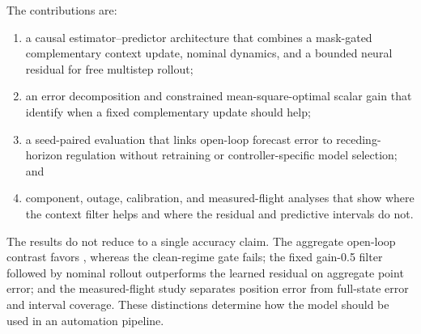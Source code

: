 The contributions are:
\begin{enumerate}
  \item a causal estimator--predictor architecture that combines a mask-gated
  complementary context update, nominal dynamics, and a bounded neural
  residual for free multistep rollout;
  \item an error decomposition and constrained mean-square-optimal scalar gain
  that identify when a fixed complementary update should help;
  \item a seed-paired evaluation that links open-loop forecast error to
  receding-horizon regulation without retraining or controller-specific model
  selection; and
  \item component, outage, calibration, and measured-flight analyses that show
  where the context filter helps and where the residual and predictive
  intervals do not.
\end{enumerate}

The results do not reduce to a single accuracy claim. The aggregate open-loop
contrast favors \method, whereas the clean-regime gate fails; the fixed
gain-0.5 filter followed by nominal rollout outperforms the learned residual on
aggregate point error; and the measured-flight study separates position error
from full-state error and interval coverage. These distinctions determine how
the model should be used in an automation pipeline.

